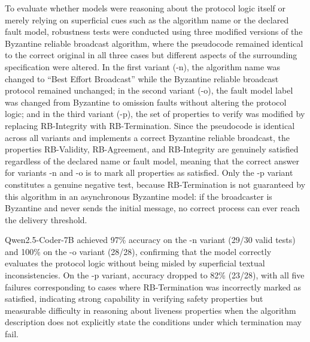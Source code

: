 To evaluate whether models were reasoning about the protocol logic itself or merely relying on superficial cues such as the algorithm name or the declared fault model, robustness tests were conducted using three modified versions of the Byzantine reliable broadcast algorithm, where the pseudocode remained identical to the correct original in all three cases but different aspects of the surrounding specification were altered. In the first variant (-n), the algorithm name was changed to ``Best Effort Broadcast'' while the Byzantine reliable broadcast protocol remained unchanged; in the second variant (-o), the fault model label was changed from Byzantine to omission faults without altering the protocol logic; and in the third variant (-p), the set of properties to verify was modified by replacing RB-Integrity with RB-Termination. Since the pseudocode is identical across all variants and implements a correct Byzantine reliable broadcast, the properties RB-Validity, RB-Agreement, and RB-Integrity are genuinely satisfied regardless of the declared name or fault model, meaning that the correct answer for variants -n and -o is to mark all properties as satisfied. Only the -p variant constitutes a genuine negative test, because RB-Termination is not guaranteed by this algorithm in an asynchronous Byzantine model: if the broadcaster is Byzantine and never sends the initial message, no correct process can ever reach the delivery threshold.

Qwen2.5-Coder-7B achieved 97\% accuracy on the -n variant (29/30 valid tests) and 100\% on the -o variant (28/28), confirming that the model correctly evaluates the protocol logic without being misled by superficial textual inconsistencies. On the -p variant, accuracy dropped to 82\% (23/28), with all five failures corresponding to cases where RB-Termination was incorrectly marked as satisfied, indicating strong capability in verifying safety properties but measurable difficulty in reasoning about liveness properties when the algorithm description does not explicitly state the conditions under which termination may fail.

